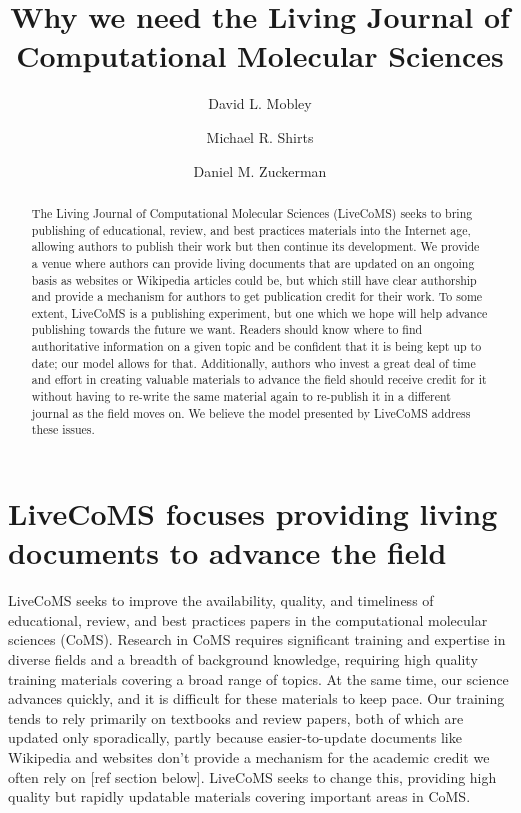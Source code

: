 \documentclass[9pt]{livecoms}
\title{Why we need the Living Journal of Computational Molecular Sciences}
\author[1*]{David L. Mobley}
\author[2*]{Michael R. Shirts}
\author[3*]{Daniel M. Zuckerman}
\affil[1]{Department of Pharmaceutical Sciences and Chemistry, University of California, Irvine}
\affil[2]{Department of Chemical and Biological Engineering, University of Colorado Boulder}
\affil[2]{Department of Biomedical Engineering, Oregon Health Sciences University}
\begin{document}
\maketitle

\begin{abstract}
The Living Journal of Computational Molecular Sciences (LiveCoMS) seeks to bring publishing of educational, review, and best practices materials into the Internet age, allowing authors to publish their work but then continue its development.
We provide a venue where authors can provide living documents that are updated on an ongoing basis as websites or Wikipedia articles could be, but which still have clear authorship and provide a mechanism for authors to get publication credit for their work.
To some extent, LiveCoMS is a publishing experiment, but one which we hope will help advance publishing towards the future we want.
Readers should know where to find authoritative information on a given topic and be confident that it is being kept up to date; our model allows for that. 
Additionally, authors who invest a great deal of time and effort in creating valuable materials to advance the field should receive credit for it without having to re-write the same material again to re-publish it in a different journal as the field moves on. 
We believe the model presented by LiveCoMS address these issues.
\end{abstract}


\section{LiveCoMS focuses providing living documents to advance the field}

LiveCoMS seeks to improve the availability, quality, and timeliness of educational, review, and best practices papers in the computational molecular sciences (CoMS).
Research in CoMS requires significant training and expertise in diverse fields and a breadth of background knowledge, requiring high quality training materials covering a broad range of topics.
At the same time, our science advances quickly, and it is difficult for these materials to keep pace. 
Our training tends to rely primarily on textbooks and review papers, both of which are updated only sporadically, partly because easier-to-update documents like Wikipedia and websites don't provide a mechanism for the academic credit we often rely on [ref section below].
LiveCoMS seeks to change this, providing high quality but rapidly updatable materials covering important areas in CoMS.
\end{document}
